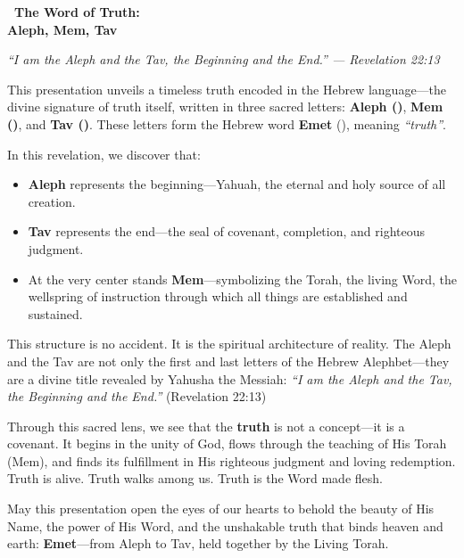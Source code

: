 \documentclass[12]{amsart}
\theoremstyle{plain}
\begin{document}
\begin{titlepage}
    \centering
    \vspace*{3cm}
    
{\Huge\bfseries\ The Word of Truth:\\ Aleph, Mem, Tav}
\author{\Large A Simple Revelation for All People}
\date{}
    \vspace{0.5cm}
   \begin{center}
\large\textit{“I am the Aleph and the Tav, the Beginning and the End.” — Revelation 22:13}
\end{center}

    \vfill

    \vspace{1em}
    \begin{minipage}{1\textwidth}
        
This presentation unveils a timeless truth encoded in the Hebrew language—the divine signature of truth itself, written in three sacred letters: \textbf{Aleph (\א)}, \textbf{Mem (\מ)}, and \textbf{Tav (\ת)}. These letters form the Hebrew word \textbf{Emet} (), meaning \textit{“truth”}.

\medskip

In this revelation, we discover that:
\begin{itemize}
  \item \textbf{Aleph} represents the beginning—Yahuah, the eternal and holy source of all creation.
  \item \textbf{Tav} represents the end—the seal of covenant, completion, and righteous judgment.
  \item At the very center stands \textbf{Mem}—symbolizing the Torah, the living Word, the wellspring of instruction through which all things are established and sustained.
\end{itemize}

\medskip

This structure is no accident. It is the spiritual architecture of reality. The Aleph and the Tav are not only the first and last letters of the Hebrew Alephbet—they are a divine title revealed by Yahusha the Messiah: \textit{“I am the Aleph and the Tav, the Beginning and the End.”} (Revelation 22:13)

\medskip

Through this sacred lens, we see that the \textbf{truth} is not a concept—it is a covenant. It begins in the unity of God, flows through the teaching of His Torah (Mem), and finds its fulfillment in His righteous judgment and loving redemption. Truth is alive. Truth walks among us. Truth is the Word made flesh.

\medskip

May this presentation open the eyes of our hearts to behold the beauty of His Name, the power of His Word, and the unshakable truth that binds heaven and earth: \textbf{Emet}—from Aleph to Tav, held together by the Living Torah.

    \end{minipage}
\end{titlepage}
\clearpage
\end{document}
